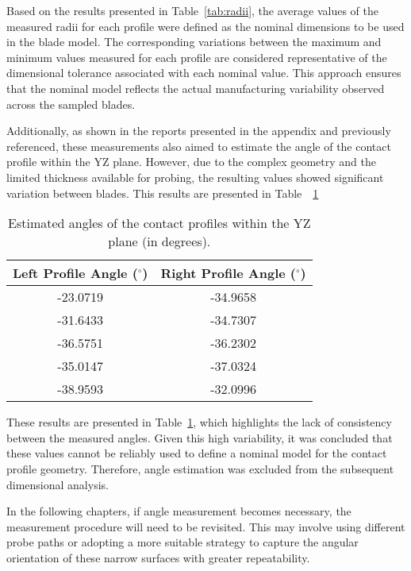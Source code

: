 Based on the results presented in Table~\ref{tab:radii}, the average values of the measured radii for each profile were defined as the nominal dimensions to be used in the blade model. The corresponding variations between the maximum and minimum values measured for each profile are considered representative of the dimensional tolerance associated with each nominal value. This approach ensures that the nominal model reflects the actual manufacturing variability observed across the sampled blades.

Additionally, as shown in the reports presented in the appendix and previously referenced, these measurements also aimed to estimate the angle of the contact profile within the YZ plane. However, due to the complex geometry and the limited thickness available for probing, the resulting values showed significant variation between blades.
This results are presented in Table~~\ref{tab:angulos}

\begin{table}[H]
    \centering
    \caption{Estimated angles of the contact profiles within the YZ plane (in degrees).}
    \label{tab:angulos}
    \begin{tabular}{c|c}
        \hline
        \textbf{Left Profile Angle ($^{\circ}$)} & \textbf{Right Profile Angle ($^{\circ}$)} \\ \hline
        -23.0719 & -34.9658 \\
        -31.6433 & -34.7307 \\
        -36.5751 & -36.2302 \\
        -35.0147 & -37.0324 \\
        -38.9593 & -32.0996 \\ \hline
    \end{tabular}
\end{table}

These results are presented in Table~\ref{tab:angulos}, which highlights the lack of consistency between the measured angles. Given this high variability, it was concluded that these values cannot be reliably used to define a nominal model for the contact profile geometry. Therefore, angle estimation was excluded from the subsequent dimensional analysis.

In the following chapters, if angle measurement becomes necessary, the measurement procedure will need to be revisited. This may involve using different probe paths or adopting a more suitable strategy to capture the angular orientation of these narrow surfaces with greater repeatability.
